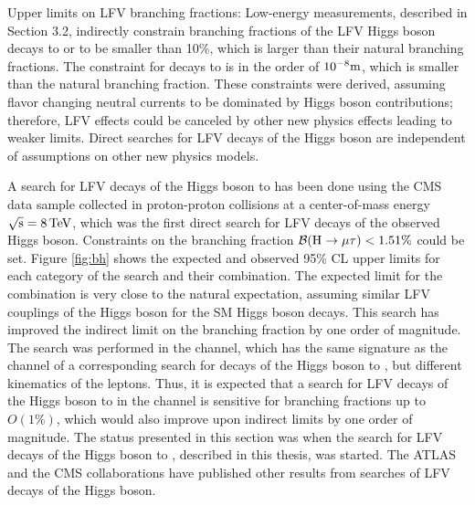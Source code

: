 Upper limits on LFV branching fractions: Low-energy measurements, described in Section 3.2, indirectly constrain branching fractions of the LFV Higgs boson decays to \mutau or \etau to be smaller than 10\%, which is larger than their natural branching fractions. The constraint for decays to \emm is in the order of $10^{-8} \text{m}$, which is smaller than the natural branching fraction. These constraints were derived, assuming flavor changing neutral currents to be dominated by Higgs boson contributions; therefore, LFV effects could be canceled by other new physics effects leading to weaker limits. Direct searches for LFV decays of the Higgs boson are independent of assumptions on other new physics models.

A search for LFV decays of the Higgs boson to \mutau has been done using the CMS data sample collected in proton-proton collisions at a center-of-mass energy $\sqrt{\text{s}} = 8 \,\text{Te\hspace{-.08em}V}$, which was the first direct search for LFV decays of the observed Higgs boson. Constraints on the branching fraction $\mathcal{B}(\text{H} \to \mu \tau) < 1.51 \%$ could be set. Figure \ref{fig:bh} shows the expected and observed 95\% CL upper limits for each category of the search and their combination. The expected limit for the combination is very close to the natural expectation, assuming similar LFV couplings of the Higgs boson for the SM Higgs boson decays. This search has improved the indirect limit on the branching fraction \BHmt by one order of magnitude. The search was performed in the \mue channel, which has the same signature as the \emu channel of a corresponding search for decays of the Higgs boson to \etau, but different kinematics of the leptons. Thus, it is expected that a search for LFV decays of the Higgs boson to \etau in the \emu channel is sensitive for branching fractions up to $O(1\%)$, which would also improve upon indirect limits by one order of magnitude. The status presented in this section was when the search for LFV decays of the Higgs boson to \emu, described in this thesis, was started. The ATLAS and the CMS collaborations have published other results from searches of LFV decays of the Higgs boson.

